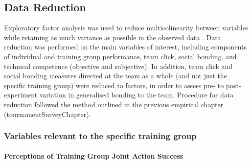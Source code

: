 \documentclass[english]{article}\usepackage[]{graphicx}\usepackage[]{color}
\newcommand{\myparagraph}[1]{\paragraph{#1}\mbox{}\\}
\begin{document}














\subsection{Data Reduction}
Exploratory factor analysis was used to reduce multicolinearity between variables while retaining as much variance as possible in the observed data \citep{Yong2013}.
Data reduction was performed on the main variables of interest, including components of individual and training group performance, team click, social bonding, and technical competence (objective and subjective). In addition, team click and social bonding measures directed at the team as a whole (and not just the specific training group) were reduced to factors, in order to assess pre- to post-experiment variation in generalised bonding to the team.
Procedure for data reduction followed the method outlined in the previous empirical chapter (tournamentSurveyChapter).
\subsubsection{Variables relevant to the specific training group}

\myparagraph{Perceptions of Training Group Joint Action Success}
\end{document}
